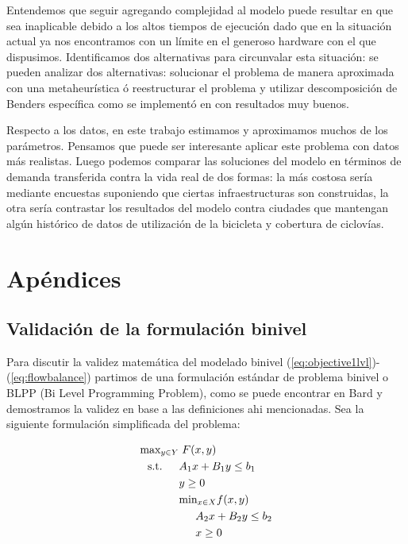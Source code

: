 \documentclass{article}
\newcommand{\modelspace}{\hspace{1.5em}}
\begin{document}
  Entendemos que seguir agregando complejidad al modelo puede resultar en que sea inaplicable debido a los altos tiempos de ejecución dado que en la situación actual ya nos encontramos con un límite en el generoso hardware con el que dispusimos. Identificamos dos alternativas para circunvalar esta situación: se pueden analizar dos alternativas: solucionar el problema de manera aproximada con una metaheurística ó reestructurar el problema y utilizar descomposición de Benders específica como se implementó en \cite{lim2021} con resultados muy buenos.

  Respecto a los datos, en este trabajo estimamos y aproximamos muchos de los parámetros. Pensamos que puede ser interesante aplicar este problema con datos más realistas. Luego podemos comparar las soluciones del modelo en términos de demanda transferida contra la vida real de dos formas: la más costosa sería mediante encuestas suponiendo que ciertas infraestructuras son construidas, la otra sería contrastar los resultados del modelo contra ciudades que mantengan algún histórico de datos de utilización de la bicicleta y cobertura de ciclovías.

  \newpage
  \section{Apéndices}

  \subsection{Validación de la formulación binivel}
  \label{sect:apendixbilevelvalidation}

  Para discutir la validez matemática del modelado binivel (\ref{eq:objective1lvl})-(\ref{eq:flowbalance}) partimos de una formulación estándar de problema binivel o BLPP (Bi Level Programming Problem), como se puede encontrar en Bard \cite{bardbook} y demostramos la validez en base a las definiciones ahi mencionadas.
  Sea la siguiente formulación simplificada del problema:

  \begin{align}
    \text{max}_{y \in Y}    & \; F(x, y) \label{bilevelgeneric1} \\
    \text{s.t.} \modelspace & A_1 x + B_1 y \leq b_1 \\
                            & y \geq 0 \\
                            & \text{min}_{x \in X} f(x, y) \\
                            & \modelspace A_2 x + B_2 y \leq b_2 \label{bilevelgeneric5} \\
                            & \modelspace x \geq 0 \label{bilevelgeneric6}
  \end{align}
\end{document}
